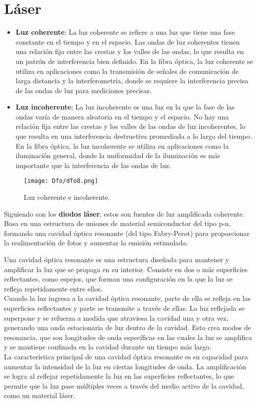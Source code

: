 \documentclass[12pt,fleqn,a4paper,oneside]{LegrandOrangeBook}
\begin{document}
\section{Láser}
\begin{itemize}
\item \textbf{Luz coherente}: La luz coherente se refiere a una luz que tiene una fase constante en el tiempo y en el espacio. Las ondas de luz coherentes tienen una relación fija entre las crestas y los valles de las ondas, lo que resulta en un patrón de interferencia bien definido. En la fibra óptica, la luz coherente se utiliza en aplicaciones como la transmisión de señales de comunicación de larga distancia y la interferometría, donde se requiere la interferencia precisa de las ondas de luz para mediciones precisas.
\item \textbf{Luz incoherente}: La luz incoherente es una luz en la que la fase de las ondas varía de manera aleatoria en el tiempo y el espacio. No hay una relación fija entre las crestas y los valles de las ondas de luz incoherentes, lo que resulta en una interferencia destructiva promediada a lo largo del tiempo. En la fibra óptica, la luz incoherente se utiliza en aplicaciones como la iluminación general, donde la uniformidad de la iluminación es más importante que la interferencia de las ondas de luz.
\end{itemize}
\begin{figure}[H]
\centering
\texttt{[image: Dfo/dfo8.png]}
\caption{Luz coherente e incoherente.}
\end{figure}
Siguiendo con los \textbf{diodos láser}, estos son fuentes de luz amplificada coherente. Basa en una estructura de uniones de material semiconductor del tipo p-n, formando una cavidad óptica resonante  (del tipo Fabry-Perot) para proporcionar la realimentación de fotos y aumentar la emisión estimulada.
\begin{definition}
Una cavidad óptica resonante es una estructura diseñada para mantener y amplificar la luz que se propaga en su interior. Consiste en dos o más superficies reflectantes, como espejos, que forman una configuración en la que la luz se refleja repetidamente entre ellos.\\
Cuando la luz ingresa a la cavidad óptica resonante, parte de ella se refleja en las superficies reflectantes y parte se transmite a través de ellas. La luz reflejada se superpone y se refuerza a medida que atraviesa la cavidad una y otra vez, generando una onda estacionaria de luz dentro de la cavidad. Esto crea modos de resonancia, que son longitudes de onda específicas en las cuales la luz se amplifica y se mantiene confinada en la cavidad durante un tiempo más largo.\\
La característica principal de una cavidad óptica resonante es su capacidad para aumentar la intensidad de la luz en ciertas longitudes de onda. La amplificación se logra al reflejar repetidamente la luz en las superficies reflectantes, lo que permite que la luz pase múltiples veces a través del medio activo de la cavidad, como un material láser.
\end{definition}
\end{document}
